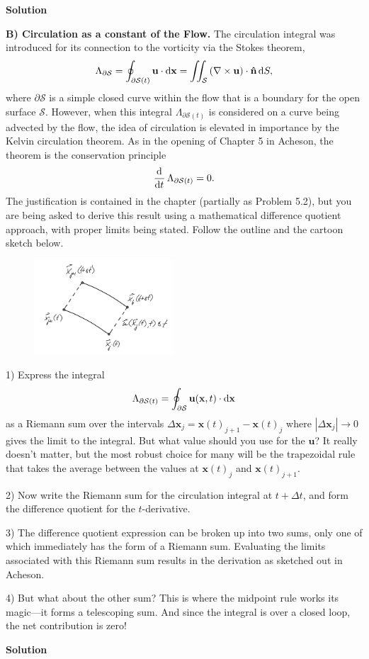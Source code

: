 \documentclass{article}
\def\*#1{\mathbf{#1}}
\newcommand{\fS}{\mathcal{S}} %
\newcommand{\nhat}{\mathbf{\hat{n}}}
\begin{document}
\newpage

\textbf{Solution}

\newpage

\textbf{B) Circulation as a constant of the Flow.}
The circulation integral was introduced for its connection to the
vorticity via the Stokes theorem,
%
\begin{equation*}
    \Lambda_{\partial \fS}
        = \oint_{\partial \fS (t)} \*u \cdot \dif \*x
        = \iint_{\fS} \del{\nabla \times \*u} \cdot \nhat \dif S
        ,
\end{equation*}
%
where $\partial \fS$ is a simple closed curve within the flow that is a
boundary for the open surface $\fS$. However, when this integral
$\Lambda_{\partial \fS (t)}$ is considered on a curve being advected by
the flow, the idea of circulation is elevated in importance by the
Kelvin circulation theorem. As in the opening of Chapter 5 in Acheson,
the theorem is the conservation principle
%
\begin{equation*}
    \dod{}{t} \Lambda_{\partial \fS (t)} = 0
    .
\end{equation*}
%
The justification is contained in the chapter (partially as Problem
5.2), but you are being asked to derive this result using a mathematical
difference quotient approach, with proper limits being stated. Follow
the outline and the cartoon sketch below.
%
\begin{figure}[!ht]
    \includegraphics[width=14em]{b-diag}
    \centering
\end{figure}

1) Express the integral
%
\begin{equation*}
    \Lambda_{\partial \fS (t)} = \oint_{\partial \fS} \*u(\*x, t) \cdot \dif \*x
\end{equation*}
%
as a Riemann sum over the intervals $\Delta \*x_j = \*x(t)_{j + 1} -
\*x(t)_j$ where $|\Delta \*x_j| \to 0$ gives the limit to the integral.
But what value should you use for the $\*u$? It really doesn't matter,
but the most robust choice for many will be the trapezoidal rule that
takes the average between the values at $\*x(t)_j$ and $\*x(t)_{j + 1}$.

2) Now write the Riemann sum for the circulation integral at $t + \Delta
t$, and form the difference quotient for the $t$-derivative.

3) The difference quotient expression can be broken up into two sums,
only one of which immediately has the form of a Riemann sum. Evaluating
the limits associated with this Riemann sum results in the derivation as
sketched out in Acheson.

4) But what about the other sum? This is where the midpoint rule works
its magic---it forms a telescoping sum. And since the integral is
over a closed loop, the net contribution is zero!

\newpage

\textbf{Solution}
\end{document}
